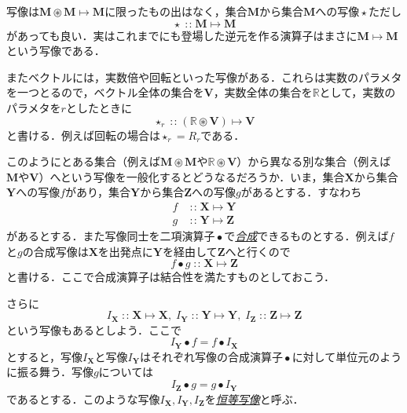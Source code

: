 \documentclass[a5paper,draft]{jsbook}
\newcommand{\keyword}[1]{{\underline{\emph{#1}}}}
\newcommand{\mathSet}[1]{\mathbf{#1}} %
\newcommand{\mathSpecialSet}[1]{\mathbb{#1}} %
\newcommand{\mathUnaryOperator}[1]{\operatorname{#1}}
\newcommand{\mathAnyUnaryOperator}{\mathUnaryOperator{\star}}
\newcommand{\mathBinaryOperator}[1]{\operatorname{#1}}
\newcommand{\mathCompose}{\mathBinaryOperator{\bullet}}
\newcommand{\mathIn}{\mathBinaryOperator{:\!:}}
\newcommand{\mathSetTimes}{\mathBinaryOperator{\circledast}}
\newcommand{\mathMapsTo}{\mapsto}
\newcommand{\mathMorph}[2]{#1\mathMapsTo#2}
\begin{document}
写像は$\mathMorph{\mathSet{M}\mathSetTimes\mathSet{M}}{\mathSet{M}}$に限ったもの出はなく，集合$\mathSet{M}$から集合$\mathSet{M}$への写像$\mathAnyUnaryOperator$ただし
\begin{equation}
\mathAnyUnaryOperator\mathIn\mathMorph{\mathSet{M}}{\mathSet{M}}
\end{equation}
があっても良い．実はこれまでにも登場した逆元を作る演算子はまさに$\mathMorph{\mathSet{M}}{\mathSet{M}}$という写像である．

またベクトルには，実数倍や回転といった写像がある．これらは実数のパラメタを一つとるので，ベクトル全体の集合を$\mathSet{V}$，実数全体の集合を$\mathSpecialSet{R}$として，実数のパラメタを$r$としたときに
\begin{equation}
\mathAnyUnaryOperator_r\mathIn{}\mathMorph{(\mathSpecialSet{R}\mathSetTimes\mathSet{V})}{\mathSet{V}}
\end{equation}
と書ける．例えば回転の場合は$\mathAnyUnaryOperator_r=R_r$である．

このようにとある集合（例えば$\mathSet{M}\mathSetTimes\mathSet{M}$や$\mathSpecialSet{R}\mathSetTimes\mathSet{V}$）から異なる別な集合（例えば$\mathSet{M}$や$\mathSet{V}$）へという写像を一般化するとどうなるだろうか．いま，集合$\mathSet{X}$から集合$\mathSet{Y}$への写像$f$があり，集合$\mathSet{Y}$から集合$\mathSet{Z}$への写像$g$があるとする．すなわち
\begin{align}
f&\mathIn\mathMorph{\mathSet{X}}{\mathSet{Y}}\\
g&\mathIn\mathMorph{\mathSet{Y}}{\mathSet{Z}}
\end{align}
があるとする．また写像同士を二項演算子$\mathCompose$で\keyword{合成}できるものとする．例えば$f$と$g$の合成写像は$\mathSet{X}$を出発点に$\mathSet{Y}$を経由して$\mathSet{Z}$へと行くので
\begin{equation}
f\mathCompose g\mathIn\mathMorph{\mathSet{X}}{\mathSet{Z}}
\end{equation}
と書ける．ここで合成演算子は結合性を満たすものとしておこう．

さらに
\begin{equation}
I_\mathSet{X}\mathIn\mathMorph{\mathSet{X}}{\mathSet{X}},\;I_\mathSet{Y}\mathIn\mathMorph{\mathSet{Y}}{\mathSet{Y}},\;I_\mathSet{Z}\mathIn\mathMorph{\mathSet{Z}}{\mathSet{Z}}
\end{equation}
という写像もあるとしよう．ここで
\begin{equation}
I_\mathSet{Y}\mathCompose f=f\mathCompose I_\mathSet{X}
\end{equation}
とすると，写像$I_\mathSet{X}$と写像$I_\mathSet{Y}$はそれぞれ写像の合成演算子$\mathCompose$に対して単位元のように振る舞う．写像$g$については
\begin{equation}
I_\mathSet{Z}\mathCompose g=g\mathCompose I_\mathSet{Y}
\end{equation}
であるとする．このような写像$I_\mathSet{X},I_\mathSet{Y},I_\mathSet{Z}$を\keyword{恒等写像}と呼ぶ．
\end{document}
